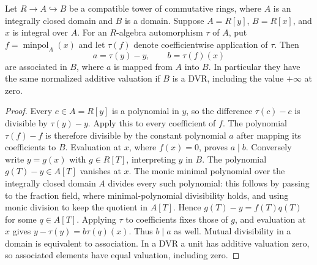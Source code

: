 \begin{lemma}
\label{fw:tate-polynomial-divisibility}
\leanok
Let $R\to A\hookrightarrow B$ be a compatible tower of commutative rings,
where $A$ is an integrally closed domain and $B$ is a domain. Suppose
$A=R[y]$, $B=R[x]$, and $x$ is integral over $A$. For an $R$-algebra
automorphism $\tau$ of $A$, put $f=\operatorname{minpol}_A(x)$ and let
$\tau(f)$ denote coefficientwise application of $\tau$. Then
\[
 a=\tau(y)-y,\qquad b=\tau(f)(x)
\]
are associated in $B$, where $a$ is mapped from $A$ into $B$.
In particular they have the same normalized additive valuation if $B$
is a DVR, including the value $+\infty$ at zero.
\end{lemma}
\begin{proof}
Every $c\in A=R[y]$ is a polynomial in $y$, so the difference
$\tau(c)-c$ is divisible by $\tau(y)-y$. Apply this to every coefficient
of $f$. The polynomial $\tau(f)-f$ is therefore divisible by the
constant polynomial $a$ after mapping its coefficients to $B$.
Evaluation at $x$, where $f(x)=0$, proves $a\mid b$.
Conversely write $y=g(x)$ with $g\in R[T]$, interpreting $y$ in $B$.
The polynomial $g(T)-y\in A[T]$ vanishes at $x$. The monic minimal
polynomial over the integrally closed domain $A$ divides every such
polynomial: this follows by passing to the fraction field, where
minimal-polynomial divisibility holds, and using monic division to
keep the quotient in $A[T]$. Hence $g(T)-y=f(T)q(T)$ for some
$q\in A[T]$. Applying $\tau$ to coefficients fixes those of $g$,
and evaluation at $x$ gives $y-\tau(y)=b\tau(q)(x)$.
Thus $b\mid a$ as well. Mutual divisibility in a domain is equivalent
to association. In a DVR a unit has additive valuation zero, so
associated elements have equal valuation, including zero.
\end{proof}

